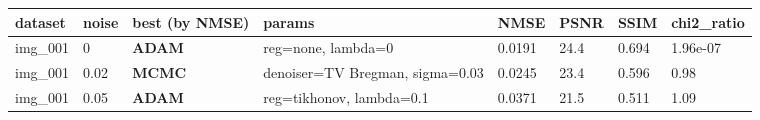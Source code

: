 \begin{center}\begin{minipage}{\linewidth}\centering
{}
\begin{adjustbox}{max width=\linewidth}
\begin{tabular}{llllllll}
\toprule
dataset & noise & best (by NMSE) & params & NMSE & PSNR & SSIM & chi2\_ratio \\
\midrule
img\_001 & 0 & \textbf{ADAM} & reg=none, lambda=0 & 0.0191 & 24.4 & 0.694 & 1.96e-07 \\
img\_001 & 0.02 & \textbf{MCMC} & denoiser=TV Bregman, sigma=0.03 & 0.0245 & 23.4 & 0.596 & 0.98 \\
img\_001 & 0.05 & \textbf{ADAM} & reg=tikhonov, lambda=0.1 & 0.0371 & 21.5 & 0.511 & 1.09 \\
\bottomrule
\end{tabular}\end{adjustbox}\end{minipage}\end{center}
